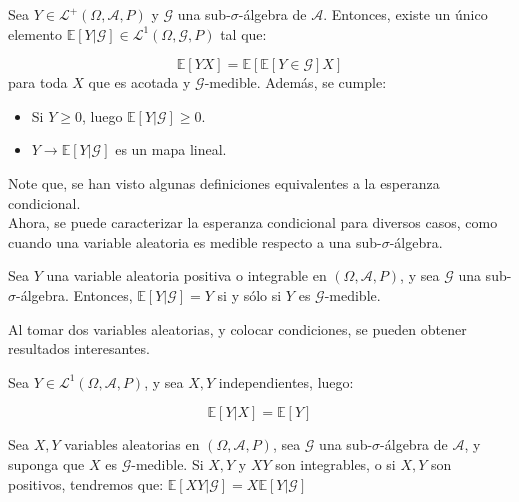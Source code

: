 \begin{theorem}
	Sea $Y \in \mathcal{L}^{+}(\Omega, \mathcal{A}, P)$ y $\mathcal{G}$ una sub-$\sigma$-álgebra de $\mathcal{A}$. Entonces, existe un único elemento $\mathbb{E}[Y \vert \mathcal{G}] \in \mathcal{L}^1 (\Omega, \mathcal{G}, P)$ tal que:

	\[
		\mathbb{E}[Y X] = \mathbb{E}[ \mathbb{E}[Y \in \mathcal{G}] X ]
	\]
	para toda $X$ que es acotada y $\mathcal{G}$-medible. Además, se cumple:

	\begin{itemize}
		\item Si $Y \geq 0$, luego $\mathbb{E}[Y \vert \mathcal{G}] \geq 0$.
		\item $Y \rightarrow \mathbb{E}[Y \vert \mathcal{G}]$ es un mapa lineal. 
	\end{itemize}

\end{theorem}

Note que, se han visto algunas definiciones equivalentes a la esperanza condicional. \\

Ahora, se puede caracterizar la esperanza condicional para diversos casos, como cuando una variable aleatoria es medible respecto a una sub-$\sigma$-álgebra.

\begin{theorem}
	Sea $Y$ una variable aleatoria positiva o integrable en $(\Omega, \mathcal{A},P)$, y sea $\mathcal{G}$ una sub-$\sigma$-álgebra. Entonces, $\mathbb{E}[Y \vert \mathcal{G}] = Y$ si y sólo si $Y$ es $\mathcal{G}$-medible.
\end{theorem}

Al tomar dos variables aleatorias, y colocar condiciones, se pueden obtener resultados interesantes.

\begin{theorem}
	Sea $Y \in \mathcal{L}^1 (\Omega, \mathcal{A}, P)$, y sea $X, Y$ independientes, luego:

	\[
		\mathbb{E}[Y \vert X] = \mathbb{E}[Y]
	\]
\end{theorem}


\begin{theorem}
	Sea $X, Y$ variables aleatorias en $(\Omega, \mathcal{A}, P)$, sea $\mathcal{G}$ una sub-$\sigma$-álgebra de $\mathcal{A}$, y suponga que $X$ es $\mathcal{G}$-medible. Si $X, Y$ y $XY$ son integrables, o si $X,Y$ son positivos, tendremos que:
	$\mathbb{E}[XY \vert \mathcal{G}] = X \mathbb{E}[Y \vert \mathcal{G}]$
\end{theorem}

